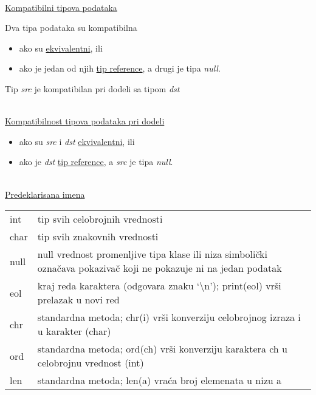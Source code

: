 \hspace{0cm} \\

\underline{Kompatibilni tipova podataka}

Dva tipa podataka su kompatibilna 

\begin{itemize}
\item ako su \underline{ekvivalentni}, ili 
\item ako je jedan od njih \underline{tip reference}, a drugi je tipa \textit{null}. 
\end{itemize}
 
Tip \textit{src} je kompatibilan pri dodeli sa tipom \textit{dst}

\hspace{0pt} \\

\underline{Kompatibilnost tipova podataka pri dodeli}

\begin{itemize}
\item ako su \textit{src} i \textit{dst} \underline{ekvivalentni}, ili
\item ako je \textit{dst} \underline{tip reference}, a \textit{src} je tipa \textit{null}. 
\end{itemize}

\hspace{0pt} \\

\underline{Predeklarisana imena}

\begin{tabular}{l p{10cm}}
int & tip svih celobrojnih vrednosti \\
char & tip svih znakovnih vrednosti \\
null & null vrednost promenljive tipa klase ili niza simbolički označava pokazivač koji ne pokazuje ni na jedan podatak \\
eol & kraj reda karaktera (odgovara znaku `\textbackslash n'); print(eol) vrši prelazak u novi red \\
chr & standardna metoda; chr(i) vrši konverziju celobrojnog izraza i u karakter (char) \\
ord & standardna metoda; ord(ch) vrši konverziju karaktera ch u celobrojnu vrednost (int) \\ 
len & standardna metoda; len(a) vraća broj elemenata u nizu a \\

\end{tabular}

